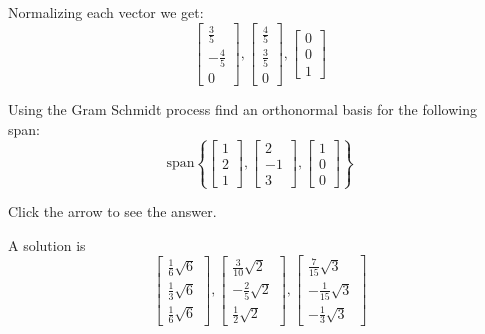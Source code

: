 \documentclass{ximera}
\begin{document}
\begin{problem}
\begin{expandable}
Normalizing each vector we get:
\[
\left[
\begin{array}{c}
\frac{3}{5} \\
-\frac{4}{5} \\
0
\end{array}
\right] ,\left[
\begin{array}{c}
\frac{4}{5} \\
\frac{3}{5} \\
0
\end{array}
\right] ,\left[
\begin{array}{c}
0 \\
0 \\
1
\end{array}
\right]
\]
\end{expandable}
\end{problem}

\begin{problem}\label{prob:use_GS_on_span}
Using the Gram Schmidt process find an
orthonormal basis for the following span:
 \[
\mbox{span} \left\{ \left[
\begin{array}{r}
1 \\
2 \\
1
\end{array}
\right] ,\left[
\begin{array}{r}
2 \\
-1 \\
3
\end{array}
\right] , \left[
\begin{array}{r}
1 \\
0 \\
0
\end{array}
\right] \right\}
\]

Click the arrow to see the answer.
\begin{expandable}
A solution is
\[
\left[
\begin{array}{c}
\frac{1}{6}\sqrt{6} \\
\frac{1}{3}\sqrt{6} \\
\frac{1}{6}\sqrt{6}
\end{array}
\right] ,\left[
\begin{array}{c}
\frac{3}{10}\sqrt{2} \\
-\frac{2}{5}\sqrt{2} \\
\frac{1}{2}\sqrt{2}
\end{array}
\right] ,\left[
\begin{array}{c}
\frac{7}{15}\sqrt{3} \\
-\frac{1}{15}\sqrt{3} \\
-\frac{1}{3}\sqrt{3}
\end{array}
\right]
\]
\end{expandable}
\end{problem}
\end{document}
